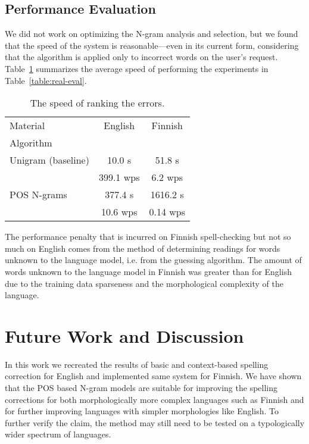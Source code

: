 \documentclass{llncs}
\begin{document}
\subsection{Performance Evaluation}

We did not work on optimizing the N-gram analysis and selection,
but we found that the speed of the system is reasonable---even in its current
form, considering that the algorithm is applied only to incorrect words on
the user's request. Table~\ref{table:speed-eval} summarizes the average
speed of performing the experiments in Table~\ref{table:real-eval}.

\begin{table}
    \caption{The speed of ranking the errors.
    \label{table:speed-eval}}
  \begin{center}
      \begin{tabular}{lcc}
        \hline
        Material  & English &  Finnish \\
        Algorithm &         &          \\
        \hline
        Unigram (baseline)
 & 10.0 s    & 51.8 s  \\
 & 399.1 wps & 6.2 wps \\
        \hline
        POS N-grams 
 &   377.4 s & 1616.2 s \\
 & 10.6  wps & 0.14 wps \\
        \hline
      \end{tabular}
  \end{center}
\end{table}

The performance penalty that is incurred on Finnish spell-checking but not so
much on English comes from the method of determining readings for words unknown
to the language model, i.e. from the guessing algorithm. The amount of words
unknown to the language model in Finnish was greater than for English due to
the training data sparseness and the morphological complexity of the language.

\section{Future Work and Discussion}
\label{sec:future-work}

In this work we recreated the results of basic and context-based spelling
correction for English and implemented same system for Finnish.  We have shown
that the POS based N-gram models are suitable for improving the spelling
corrections for both morphologically more complex languages such as Finnish and
for further improving languages with simpler morphologies like English. To
further verify the claim, the method may still need to be tested on a
typologically wider spectrum of languages.
\end{document}
